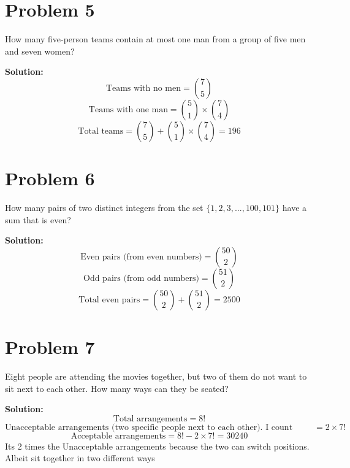 \documentclass[12pt]{article}
\begin{document}
\section*{Problem 5}
How many five-person teams contain at most one man from a group of five men and seven women?

\textbf{Solution:}
\[ \text{Teams with no men} = \binom{7}{5} \]
\[ \text{Teams with one man} = \binom{5}{1} \times \binom{7}{4} \]
\[ \text{Total teams} = \binom{7}{5} + \binom{5}{1} \times \binom{7}{4} = 196 \]

\section*{Problem 6}
How many pairs of two distinct integers from the set \(\{1, 2, 3, ..., 100, 101\}\) have a sum that is even?

\textbf{Solution:}
\[ \text{Even pairs (from even numbers)} = \binom{50}{2} \]
\[ \text{Odd pairs (from odd numbers)} = \binom{51}{2} \]
\[ \text{Total even pairs} = \binom{50}{2} + \binom{51}{2} = 2500 \]

\section*{Problem 7}
Eight people are attending the movies together, but two of them do not want to sit next to each other. How many ways can they be seated?

\textbf{Solution:}
\[ \text{Total arrangements} = 8! \]
\[ \text{Unacceptable arrangements (two specific people next to each other). I count them as a unit} = 2 \times 7! \]
\[ \text{Acceptable arrangements} = 8! - 2 \times 7! = 30240 \] Its 2 times the Unacceptable arrangements because the two can switch positions. Albeit sit together in two different ways
\end{document}
